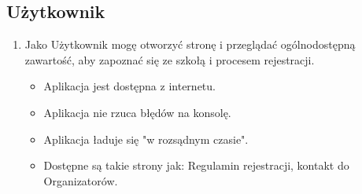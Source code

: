 \documentclass{article}
\begin{document}
\subsection{Użytkownik}
\begin{enumerate}
  \item Jako Użytkownik mogę otworzyć stronę i przeglądać ogólnodostępną zawartość, aby zapoznać się ze szkołą i procesem rejestracji.   
      \begin{itemize}
         \item Aplikacja jest dostępna z internetu.
         \item Aplikacja nie rzuca błędów na konsolę.
         \item Aplikacja ładuje się "w rozsądnym czasie".
         \item Dostępne są takie strony jak: Regulamin rejestracji, kontakt do Organizatorów.
       \end{itemize}
\end{enumerate}
\end{document}
